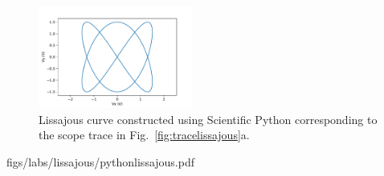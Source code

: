 \begin{figure}[htbp]
\begin{center}
\includegraphics[width=0.45\textwidth]{figs/labs/lissajous/pythonlissajous.pdf} 
\caption{Lissajous curve constructed using Scientific Python corresponding to the scope trace in Fig.~\ref{fig:tracelissajous}a.}
\label{fig:pythonlissajous}
\end{center}
\end{figure}


figs/labs/lissajous/pythonlissajous.pdf

